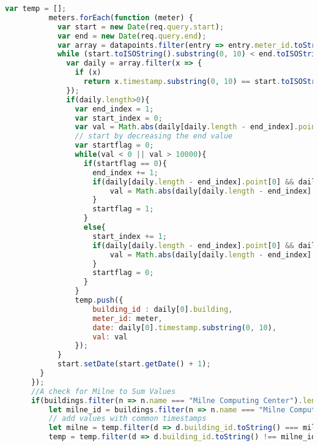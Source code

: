 \documentclass[letterpaper,10pt,serif,draftclsnofoot,onecolumn,compsoc,titlepage]{IEEEtran}
\begin{document}
\begin{lstlisting}[language=JavaScript]
          var temp = [];
          meters.forEach(function (meter) {
            var start = new Date(req.query.start);
            var end = new Date(req.query.end);
            var array = datapoints.filter(entry => entry.meter_id.toString() === meter.toString());
            while (start.toISOString().substring(0, 10) < end.toISOString().substring(0, 10)) {
              var daily = array.filter(x => {
                if (x)
                  return x.timestamp.substring(0, 10) == start.toISOString().substring(0, 10);
              });
              if(daily.length>0){
                var end_index = 1;
                var start_index = 0;
                var val = Math.abs(daily[daily.length - end_index].point[0].value) - Math.abs(daily[start_index].point[0].value);
                // start by decreasing the end value
                var startflag = 0;
                while(val < 0 || val > 10000){
                  if(startflag == 0){
                    end_index += 1;
                    if(daily[daily.length - end_index].point[0] && daily[start_index].point[0]){
                        val = Math.abs(daily[daily.length - end_index].point[0].value) - Math.abs(daily[start_index].point[0].value);
                    }
                    startflag = 1;
                  }
                  else{
                    start_index += 1;
                    if(daily[daily.length - end_index].point[0] && daily[start_index].point[0]){
                        val = Math.abs(daily[daily.length - end_index].point[0].value) - Math.abs(daily[start_index].point[0].value);
                    }
                    startflag = 0;
                  }
                }
                temp.push({
                    building_id : daily[0].building,
                    meter_id: meter,
                    date: daily[0].timestamp.substring(0, 10),
                    val: val
                });
            }
            start.setDate(start.getDate() + 1);
        }
      });
      //A check for Milne to Sum Values
      if(buildings.filter(n => n.name === "Milne Computing Center").length > 0){
          let milne_id = buildings.filter(n => n.name === "Milne Computing Center")[0].building_id;
          // add values with common timestamps
          let milne = temp.filter(d => d.building_id.toString() === milne_id.toString());
          temp = temp.filter(d => d.building_id.toString() !== milne_id.toString());


\end{lstlisting}
\end{document}
